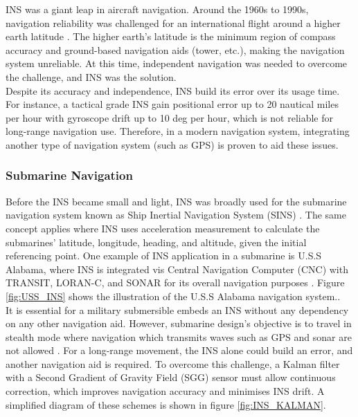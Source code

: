 \noindent INS was a giant leap in aircraft navigation. Around the 1960s to 1990s, navigation reliability was challenged for an international flight around a higher earth latitude \cite{Anonymous1964InertialNavigation}. The higher earth's latitude is the minimum region of compass accuracy and ground-based navigation aids (tower, etc.), making the navigation system unreliable. At this time, independent navigation was needed to overcome the challenge, and INS was the solution.\\

\noindent Despite its accuracy and independence, INS build its error over its usage time. For instance, a tactical grade INS gain positional error up to 20 nautical miles per hour with gyroscope drift up to 10 deg per hour, which is not reliable for long-range navigation use. Therefore, in a modern navigation system, integrating another type of navigation system (such as GPS) is proven to aid these issues.\\

\subsubsection{Submarine Navigation}
Before the INS became small and light, INS was broadly used for the submarine navigation system known as Ship Inertial Navigation System (SINS) \cite{NATOSINS}. The same concept applies where INS uses acceleration measurement to calculate the submarines' latitude, longitude, heading, and altitude, given the initial referencing point.  One example of INS application in a submarine is U.S.S Alabama, where INS is integrated vis Central Navigation Computer (CNC) with TRANSIT, LORAN-C, and SONAR for its overall navigation purposes \cite{HowNavigation}. Figure \ref{fig:USS_INS} shows the illustration of the U.S.S Alabama navigation system..\\

\noindent It is essential for a military submersible embeds an INS without any dependency on any other navigation aid. However, submarine design's objective is to travel in stealth mode where navigation which transmits waves such as GPS and sonar are not allowed \cite{Rogobete2018UsingPositioning}. For a long-range movement, the INS alone could build an error, and another navigation aid is required. To overcome this challenge, a Kalman filter with a Second Gradient of Gravity Field (SGG) sensor must allow continuous correction, which improves navigation accuracy and minimises INS drift. A simplified diagram of these schemes is shown in figure \ref{fig:INS_KALMAN}.\\

